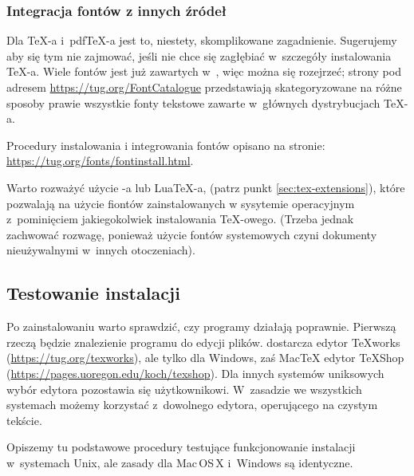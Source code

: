 \documentclass{article}
\begin{document}
\subsubsection{Integracja fontów z innych źródeł}

Dla \TeX-a i~pdf\TeX-a jest to, niestety, skomplikowane zagadnienie. Sugerujemy
aby się tym nie zajmować, jeśli nie chce się zagłębiać w~szczegóły instalowania \TeX-a.
Wiele fontów jest już zawartych w~\TL, więc można się rozejrzeć; strony pod adresem
\url{https://tug.org/FontCatalogue} przedstawiają skategoryzowane na różne sposoby prawie
wszystkie fonty tekstowe zawarte w~głównych dystrybucjach \TeX-a.

Procedury instalowania i integrowania fontów opisano na stronie:
\url{https://tug.org/fonts/fontinstall.html}.

Warto rozważyć użycie \XeTeX-a lub Lua\TeX-a, (patrz punkt \ref{sec:tex-extensions}),
które pozwalają na użycie fiontów zainstalowanych w sysytemie operacyjnym z~pominięciem
jakiegokolwiek instalowania \TeX-owego. (Trzeba jednak zachwować rozwagę,
ponieważ użycie fontów systemowych czyni dokumenty nieużywalnymi w~innych otoczeniach).

\subsection{Testowanie instalacji}
\label{sec:test-install}

Po zainstalowaniu \TL{} warto sprawdzić, czy programy działają
poprawnie. Pierwszą rzeczą będzie znalezienie programu do edycji plików.
\TL{} dostarcza edytor \TeX{}works (\url{https://tug.org/texworks}), ale tylko
dla Windows, zaś Mac\TeX{} edytor
TeXShop (\url{https://pages.uoregon.edu/koch/texshop}).
Dla innych systemów uniksowych
wybór edytora pozostawia się  użytkownikowi. W~zasadzie we wszystkich
systemach możemy korzystać z~dowolnego edytora, operującego na czystym
tekście.

Opiszemy tu podstawowe procedury testujące funkcjonowanie instalacji
w~systemach Unix, ale zasady dla Mac\,OS\,X{} i~Windows są identyczne.
\end{document}
